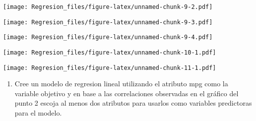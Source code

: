 \documentclass[]{article}
\newenvironment{Shaded}{\begin{snugshade}}{\end{snugshade}}
\newcommand{\KeywordTok}[1]{\textcolor[rgb]{0.13,0.29,0.53}{\textbf{#1}}}
\newcommand{\NormalTok}[1]{#1}
\newcommand{\OperatorTok}[1]{\textcolor[rgb]{0.81,0.36,0.00}{\textbf{#1}}}
\providecommand{\tightlist}{%
  \setlength{\itemsep}{0pt}\setlength{\parskip}{0pt}}
\begin{document}
\begin{Shaded}
\end{Shaded}

\texttt{[image: Regresion\_files/figure-latex/unnamed-chunk-9-2.pdf]}

\begin{Shaded}
\end{Shaded}

\texttt{[image: Regresion\_files/figure-latex/unnamed-chunk-9-3.pdf]}

\begin{Shaded}
\end{Shaded}

\texttt{[image: Regresion\_files/figure-latex/unnamed-chunk-9-4.pdf]}

\begin{Shaded}
\end{Shaded}

\texttt{[image: Regresion\_files/figure-latex/unnamed-chunk-10-1.pdf]}

\begin{Shaded}
\end{Shaded}

\texttt{[image: Regresion\_files/figure-latex/unnamed-chunk-11-1.pdf]}

\begin{enumerate}
\def\labelenumi{\arabic{enumi}.}
\setcounter{enumi}{3}
\tightlist
\item
  Cree un modelo de regresion lineal utilizando el atributo mpg como la
  variable objetivo y en base a las correlaciones observadas en el
  gráfico del punto 2 escoja al menos dos atributos para usarlos como
  variables predictoras para el modelo.
\end{enumerate}
\end{document}
